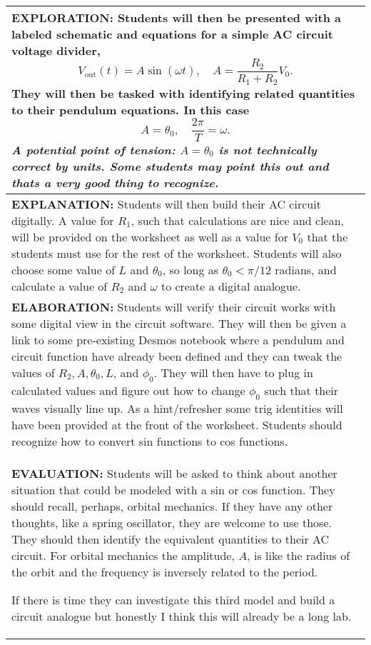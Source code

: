 \documentclass[a4paper, 12pt]{../../config/homework}
\begin{document}
\begin{center}
\begin{tabularx}{\textwidth}{| >{\raggedright\arraybackslash}X |}
\hline
\textbf{EXPLORATION:} Students will then be presented with a labeled schematic and equations for a simple AC circuit voltage divider,
\[V_\text{out}(t) = A\sin(\omega t), \quad A = \frac{R_2}{R_1 + R_2}V_0.\]
They will then be tasked with identifying related quantities to their pendulum equations. In this case
\[A = \theta_0, \quad \frac{2\pi}{T} = \omega.\]
\textit{A potential point of tension: \(A=\theta_0\) is not technically correct by units. Some students may point this out and thats a very good thing to recognize.}
\\\hline

\textbf{EXPLANATION:} Students will then build their AC circuit digitally. A value for \(R_1\), such that calculations are nice and clean, will be provided on the worksheet as well as a value for \(V_0\) that the students must use for the rest of the worksheet. Students will also choose some value of \(L\) and \(\theta_0\), so long as \(\theta_0 < \pi/12\) radians, and calculate a value of \(R_2\) and \(\omega \) to create a digital analogue.
\\\hline

\textbf{ELABORATION:} Students will verify their circuit works with some digital view in the circuit software. They will then be given a link to some pre-existing Desmos notebook where a pendulum and circuit function have already been defined and they can tweak the values of \(R_2, A, \theta_0, L\), and \(\phi_0\). They will then have to plug in calculated values and figure out how to change \(\phi_0\) such that their waves visually line up. As a hint/refresher some trig identities will have been provided at the front of the worksheet. Students should recognize how to convert sin functions to cos functions.
\\\hline

\textbf{EVALUATION:} Students will be asked to think about another situation that could be modeled with a sin or cos function. They should recall, perhaps, orbital mechanics. If they have any other thoughts, like a spring oscillator, they are welcome to use those. They should then identify the equivalent quantities to their AC circuit. For orbital mechanics the amplitude, \(A\), is like the radius of the orbit and the frequency is inversely related to the period.

If there is time they can investigate this third model and build a circuit analogue but honestly I think this will already be a long lab.
\\\hline

\end{tabularx}
\end{center}
\end{document}
